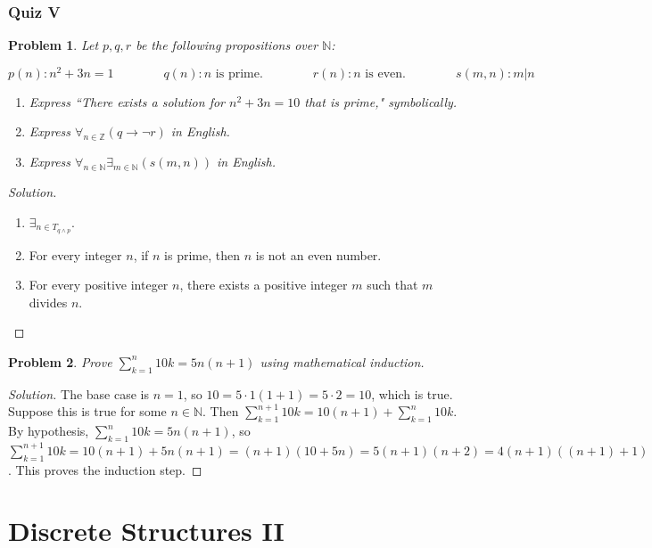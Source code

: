 \documentclass[oneside]{book}
\theoremstyle{mystyle}
\newtheorem{problem}{Problem}[section]
\begin{document}
\subsection{Quiz V}
\begin{problem}
Let $p,q,r$ be the following propositions over $\mathbb{N}$:
\begin{enumerate}
\begin{equation*}
    p(n):	n^2+3n = 1 \quad\quad\quad\quad q(n):	n\textrm{ is prime.} \quad\quad\quad\quad r(n): n\textrm{ is even.} \quad\quad\quad\quad s(m,n):	m|n
\end{equation*}
\end{enumerate}
\begin{enumerate}
    \item Express ``There exists a solution for $n^2+3n = 10$ that is prime," symbolically.
    \item Express $\forall_{n\in \mathbb{Z}}(q\rightarrow \neg r)$ in English.
    \item Express $\forall_{n\in \mathbb{N}}\exists_{m\in \mathbb{N}}(s(m,n))$ in English.
\end{enumerate}
\end{problem}
\begin{proof}[Solution]
\
\begin{enumerate}
    \item $\exists_{n\in T_{q\land p}}$.
    \item For every integer $n$, if $n$ is prime, then $n$ is not an even number.
    \item For every positive integer $n$, there exists a positive integer $m$ such that $m$ divides $n$. 
\end{enumerate}
\end{proof}
\begin{problem}
Prove $\sum_{k=1}^{n} 10k = 5n(n+1)$ using mathematical induction. 
\end{problem}
\begin{proof}[Solution]
The base case is $n=1$, so $10 = 5\cdot 1(1+1) = 5\cdot 2 = 10$, which is true. Suppose this is true for some $n\in \mathbb{N}$. Then $\sum_{k=1}^{n+1} 10k = 10(n+1) + \sum_{k=1}^{n} 10k$. By hypothesis, $\sum_{k=1}^{n} 10k = 5n(n+1)$, so $\sum_{k=1}^{n+1}10k = 10(n+1)+5n(n+1) = (n+1)(10+5n) = 5(n+1)(n+2) = 4(n+1)((n+1)+1)$. This proves the induction step.
\end{proof}
\chapter{Discrete Structures II}
\end{document}

